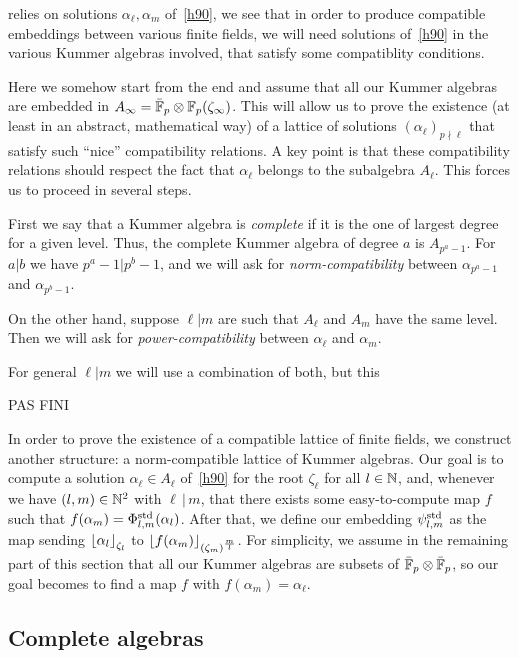 \documentclass{sig-alternate}
\begin{document}
relies on solutions $\alpha_\ell,\alpha_m$ of~\eqref{h90},
we see that in order to produce compatible embeddings between various finite fields,
we will need solutions of~\eqref{h90} in the various Kummer algebras involved,
that satisfy some compatiblity conditions.

Here we somehow start from the end and assume that all our Kummer algebras are
embedded in $A_\infty=\bar{\mathbb{F}}_{p}\otimes\mathbb{F}_{p}(\zeta_\infty)$.
This will allow us to prove the existence (at least in an abstract, mathematical way)
of a lattice of solutions $(\alpha_\ell)_{p{\nmid}\ell}$ that satisfy such ``nice''
compatibility relations. A key point is that these compatibility relations should respect
the fact that $\alpha_\ell$ belongs to the subalgebra $A_\ell$.
This forces us to proceed in several steps.

First we say that a Kummer algebra is \emph{complete} if it is the one of largest degree
for a given level. Thus, the complete Kummer algebra of degree $a$ is $A_{p^a-1}$.
For $a|b$ we have $p^a-1|p^b-1$, and we will ask for \emph{norm-compatibility}
between $\alpha_{p^a-1}$ and $\alpha_{p^b-1}$.

On the other hand, suppose $\ell|m$ are such that $A_\ell$ and $A_m$ have the same level.
Then we will ask for \emph{power-compatibility} between $\alpha_{\ell}$ and $\alpha_{m}$.

For general $\ell|m$ we will use a combination of both, but this

PAS FINI


In order to prove the existence of a compatible lattice of finite fields,
we construct another structure: a norm-compatible lattice of
Kummer algebras. Our goal is to compute a solution $\alpha_\ell\in A_\ell$
of~\eqref{h90} for the root $\zeta_\ell$ for all $l\in\mathbb{N}$, and,
whenever we have $(l, m)\in\mathbb{N}^2$ with $\ell\,|\,m$, that there exists
some easy-to-compute map $f$ such that $f(\alpha_m) =
{\Phi^{\textrm{std}}_{{l},{m}}}(\alpha_l)$. After that, we define our embedding
${\psi^{\textrm{std}}_{{l},{m}}}$ as the map sending $\left\lfloor \alpha_l \right\rfloor_{\zeta_l}$ to
$\left\lfloor f(\alpha_m) \right\rfloor_{(\zeta_m)^{\frac{m}{l}}}$. For simplicity, we assume in the
remaining part of this section that all our Kummer algebras are subsets of
$\bar{\mathbb{F}}_{p}\otimes\bar{\mathbb{F}}_p$, so our goal becomes to find a map
$f$ with $f(\alpha_m) = \alpha_\ell$.

\subsection{Complete algebras}
\end{document}
